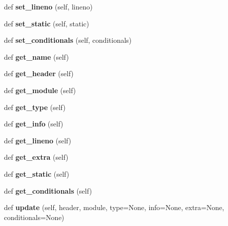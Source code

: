\begin{DoxyCompactItemize}
def {\bfseries set\+\_\+lineno} (self, lineno)
\item 
\mbox{\label{classapibuild_1_1identifier_aa2016b5cac5ea9ff87436f4221b9be30}} 
def {\bfseries set\+\_\+static} (self, static)
\item 
\mbox{\label{classapibuild_1_1identifier_a4a02172b08df1e9ad8e82e33c668c02c}} 
def {\bfseries set\+\_\+conditionals} (self, conditionals)
\item 
\mbox{\label{classapibuild_1_1identifier_a68de51d5ebdd42d6599e4d5abbd29baf}} 
def {\bfseries get\+\_\+name} (self)
\item 
\mbox{\label{classapibuild_1_1identifier_ad3c145025de422196c97586a551c41a5}} 
def {\bfseries get\+\_\+header} (self)
\item 
\mbox{\label{classapibuild_1_1identifier_a076b12c2ec6a1d04e420925cc008ccc8}} 
def {\bfseries get\+\_\+module} (self)
\item 
\mbox{\label{classapibuild_1_1identifier_a6da35386a60d8c924cfb6cf57480769d}} 
def {\bfseries get\+\_\+type} (self)
\item 
\mbox{\label{classapibuild_1_1identifier_a3f2aa0b45f0765b514943b4920236738}} 
def {\bfseries get\+\_\+info} (self)
\item 
\mbox{\label{classapibuild_1_1identifier_ae41905c0cc63d3f9d63f769502f4bf76}} 
def {\bfseries get\+\_\+lineno} (self)
\item 
\mbox{\label{classapibuild_1_1identifier_ae0d6d638049474990e0cd914afedda75}} 
def {\bfseries get\+\_\+extra} (self)
\item 
\mbox{\label{classapibuild_1_1identifier_af0392a16739cfa8eee175b6dd75d7640}} 
def {\bfseries get\+\_\+static} (self)
\item 
\mbox{\label{classapibuild_1_1identifier_a6708389617338ab767be1239fd2bdaf2}} 
def {\bfseries get\+\_\+conditionals} (self)
\item 
\mbox{\label{classapibuild_1_1identifier_a44b31a3af4b4e8758545e470087d2148}} 
def {\bfseries update} (self, header, module, type=None, info=None, extra=None, conditionals=None)
\end{DoxyCompactItemize}
